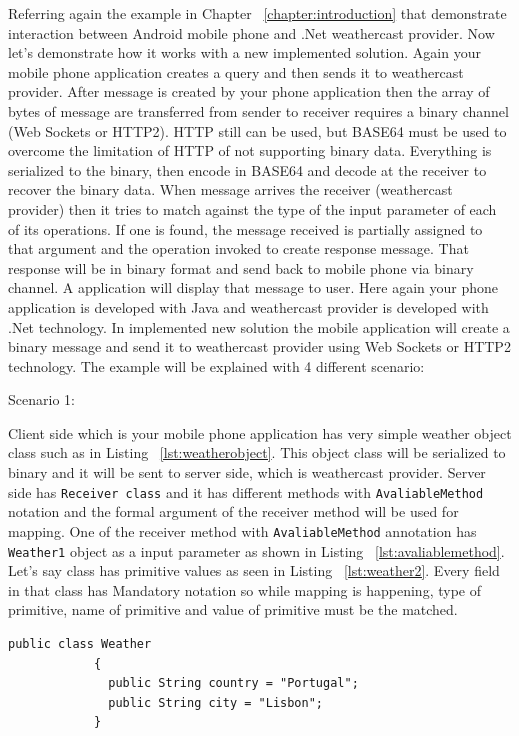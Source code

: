 Referring again the example in Chapter ~\ref{chapter:introduction} that demonstrate interaction between Android mobile phone and .Net weathercast provider. Now let's demonstrate how it works with a new implemented solution. Again your mobile phone application creates a query and then sends it to weathercast provider. After message is created by your phone application then the array of bytes of message are transferred from sender to receiver requires a binary channel (Web Sockets or HTTP2). HTTP still can be used, but BASE64 must be used to overcome the limitation of HTTP of not supporting binary data. Everything is serialized to the binary, then encode in BASE64 and decode at the receiver to recover the binary data. When message arrives the receiver (weathercast provider) then it tries to match against the type of the input parameter of each of its operations. If one is found, the message received is partially assigned to that argument and the operation invoked to create response message. That response will be in binary format and send back to mobile phone via binary channel. A application will display that message to user. Here again your phone application is developed with Java and weathercast provider is developed with .Net technology. In implemented new solution the mobile application will create a binary message and send it to weathercast provider using Web Sockets or HTTP2 technology. The example will be explained with 4 different scenario:

Scenario 1:

Client side which is your mobile phone application has very simple weather object class such as in Listing ~\ref{lst:weatherobject}. This object class will be serialized to binary and it will be sent to server side, which is weathercast provider. Server side has {\tt Receiver class} and it has different methods with {\tt AvaliableMethod} notation and the formal argument of the receiver method will be used for mapping. One of the receiver method with {\tt AvaliableMethod} annotation has {\tt Weather1} object as a input parameter as shown in Listing ~\ref{lst:avaliablemethod}. Let's say class has primitive values as seen in Listing ~\ref{lst:weather2}. Every field in that class has Mandatory notation so while mapping is happening, type of primitive, name of primitive and value of primitive must be the matched.

\begin{lstlisting}[caption=Simple weather object class, label=lst:weatherobject]
          public class Weather
            {
              public String country = "Portugal";
              public String city = "Lisbon";
            }

\end{lstlisting}

